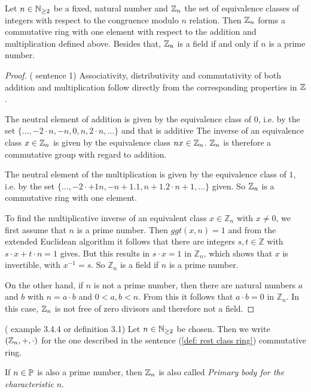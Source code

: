 \begin{theorem}
\label{def: residual class ring}
Let $ n \in \mathbb{N} _{\geq 2} $ be a fixed, natural number and
$ \mathbb{Z}_n $ the set of equivalence classes of integers with respect to the  congruence modulo $ n $ relation. Then $ \mathbb{Z}_n $ forms a commutative ring with one element with respect to the addition and multiplication defined above. Besides that, $\mathbb{Z}_n $ is a field if and only if $ n $ is a prime number.
\end{theorem}
\begin{proof} (\cite{AL} sentence 1) Associativity, distributivity and commutativity of both addition and multiplication follow directly from the corresponding properties in $ \mathbb{Z} $.

The neutral element of addition is given by the equivalence class of $ 0 $, i.e. by the set $ \{\ldots, -2 \cdot n, -n, 0, n, 2 \cdot n, \ldots \} $ and that is additive The inverse of an equivalence class $ x \in \mathbb{Z}_n $ is given by the equivalence class $ nx \in \mathbb{Z}_n $. $ \mathbb{Z}_n $ is therefore a commutative group with regard to addition.

The neutral element of the multiplication is given by the equivalence class of $ 1 $, i.e. by the set $ \{\ldots, -2 \cdot + 1 n, -n + 1.1, n + 1.2 \cdot n + 1, \ldots \} $ given. So $ \mathbb{Z}_n $ is a commutative ring with one element.

To find the multiplicative inverse of an equivalent class $ x \in \mathbb{Z} _n $ with $ x \neq 0 $, we first assume that $ n $ is a prime number. Then $ ggt (x, n) = 1 $ and from the extended Euclidean algorithm it follows that there are integers $ s, t \in \mathbb{Z} $ with $ s \cdot x + t \cdot n = 1 $ gives. But this results in $ s \cdot x = 1 $ in $ \mathbb{Z} _n $, which shows that $ x $ is invertible, with $ x ^{- 1} = s $. So $ \mathbb{Z} _n $ is a field if $ n $ is a prime number.

On the other hand, if $ n $ is not a prime number, then there are natural numbers $ a $ and $ b $ with $ n = a \cdot b $ and $ 0 <a, b <n $. From this it follows that $ a \cdot b = 0 $ in $ \mathbb{Z} _n $. In this case, $ \mathbb{Z}_n $ is not free of zero divisors and therefore not a field.
\end{proof}
\begin{definition}  (\cite{JB} example 3.4.4 or \cite{AL} definition 3.1)
Let $ n \in \mathbb{N} _{\geq 2} $ be chosen. Then we write $ (\mathbb{Z}_n, +, \cdot) $ for the one described in the sentence (\ref{def: rest class ring}) commutative ring.

If $ n \in \mathbb{P} $ is also a prime number, then $ \mathbb{Z}_n $ is also called
\textit{Primary body for the characteristic} $ n $.
\end{definition}
